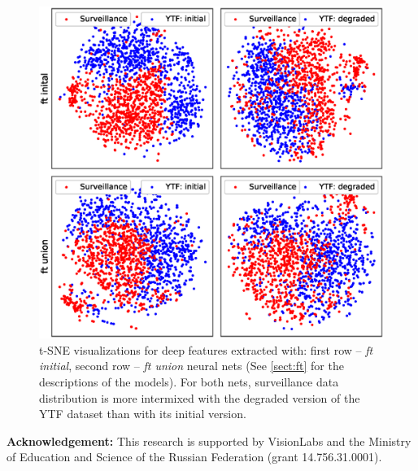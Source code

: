  

  \begin{figure}
  \centering
    \includegraphics[width=\linewidth]{Chapters/face/Fig6.eps}
    \caption{t-SNE \cite{maaten2008visualizing} visualizations for deep features extracted with: first row -- \textit{ft initial}, second row -- \textit{ft union} neural nets (See \ref{sect:ft} for the descriptions of the models). For both nets, surveillance data distribution is more intermixed with the degraded version of the YTF dataset than with its initial version.}\label{fig:tsne}
  \end{figure}



\textbf{Acknowledgement:}  This research is supported by VisionLabs and the Ministry of Education and Science of the Russian Federation (grant 14.756.31.0001). 





